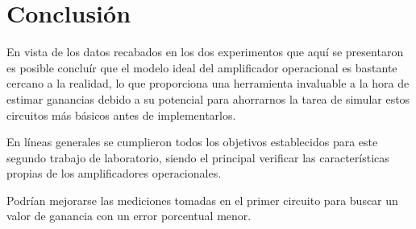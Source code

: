\section{Conclusión}

En vista de los datos recabados en los dos experimentos que aquí se presentaron
es posible concluír que el modelo ideal del amplificador operacional es 
bastante cercano a la realidad, lo que proporciona una herramienta invaluable
a la hora de estimar ganancias debido a su potencial para ahorrarnos la tarea
de simular estos circuitos más básicos antes de implementarlos.

En líneas generales se cumplieron todos los objetivos establecidos para este
segundo trabajo de laboratorio, siendo el principal verificar las 
características propias de los amplificadores operacionales.

Podrían mejorarse las mediciones tomadas en el primer circuito para buscar
un valor de ganancia con un error porcentual menor.

